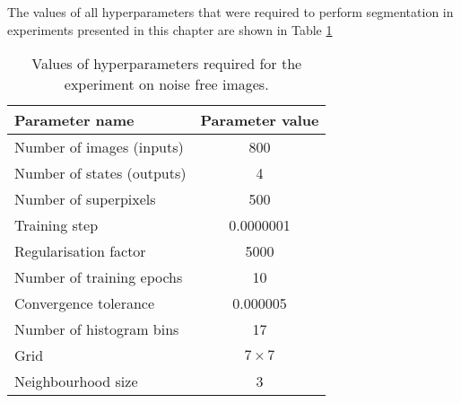 The values of all hyperparameters that were required to perform segmentation in experiments presented in this chapter are shown in Table \ref{table:hyperparameters_nonlinear}
\begin{table}[ht]
    \caption{Values of hyperparameters required for the experiment on noise free images.}
    \centering
    \begin{tabular}{|l|c|}
        \hline
        \rowcolor[HTML]{C0C0C0} 
        \textbf{Parameter name} & \textbf{Parameter value} \\ \hline
        Number of images (inputs) & 800 \\ \hline
        Number of states (outputs) & 4 \\ \hline
        Number of superpixels & 500 \\ \hline
        Training step &  0.0000001 \\ \hline
        Regularisation factor & 5000 \\ \hline
        Number of training epochs & 10 \\ \hline
        Convergence tolerance & 0.000005 \\ \hline
        Number of histogram bins & 17 \\ \hline
        Grid & $7 \times 7$ \\ \hline
        Neighbourhood size & 3 \\ \hline
    \end{tabular}
    \label{table:hyperparameters_nonlinear}
\end{table}